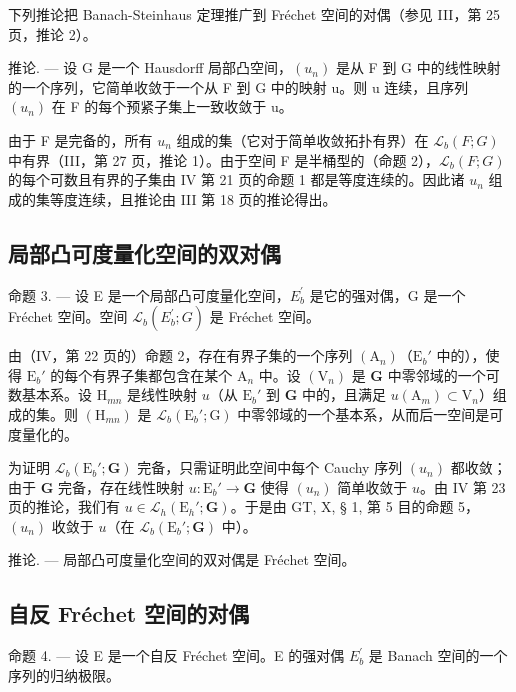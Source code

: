 下列推论把 Banach-Steinhaus 定理推广到 Fréchet 空间的对偶（参见 III，第 25 页，推论 2）。

推论. --- 设 G 是一个 Hausdorff 局部凸空间，\((u_{n})\) 是从 F 到 G 中的线性映射的一个序列，它简单收敛于一个从 F 到 G 中的映射 u。则 u 连续，且序列 \((u_{n})\) 在 F 的每个预紧子集上一致收敛于 u。

由于 F 是完备的，所有 \(u_{n}\) 组成的集（它对于简单收敛拓扑有界）在 \(\mathcal{L}_{b}(F;G)\) 中有界（III，第 27 页，推论 1）。由于空间 F 是半桶型的（命题 2），\(\mathcal{L}_{b}(F;G)\) 的每个可数且有界的子集由 IV 第 21 页的命题 1 都是等度连续的。因此诸 \(u_{n}\) 组成的集等度连续，且推论由 III 第 18 页的推论得出。

\subsection{局部凸可度量化空间的双对偶}

命题 3. --- 设 E 是一个局部凸可度量化空间，\(E_{b}^{\prime}\) 是它的强对偶，G 是一个 Fréchet 空间。空间 \(\mathcal{L}_{b}(E_{b}^{\prime}; G)\) 是 Fréchet 空间。

由（IV，第 22 页的）命题 2，存在有界子集的一个序列 \((\mathrm{A}_n)\)（\(\mathrm{E}_b'\) 中的），使得 \(\mathrm{E}_b'\) 的每个有界子集都包含在某个 \(\mathrm{A}_n\) 中。设 \((\mathrm{V}_n)\) 是 \(\mathbf{G}\) 中零邻域的一个可数基本系。设 \(\mathrm{H}_{mn}\) 是线性映射 \(u\)（从 \(\mathrm{E}_b'\) 到 \(\mathbf{G}\) 中的，且满足 \(u(\mathrm{A}_m) \subset \mathrm{V}_n\)）组成的集。则 \((\mathrm{H}_{mn})\) 是 \(\mathcal{L}_b(\mathrm{E}_b'; \mathrm{G})\) 中零邻域的一个基本系，从而后一空间是可度量化的。

为证明 \(\mathcal{L}_b(\mathrm{E}_b';\mathbf{G})\) 完备，只需证明此空间中每个 Cauchy 序列 \((u_n)\) 都收敛；由于 \(\mathbf{G}\) 完备，存在线性映射 \(u:\mathrm{E}_b' \to \mathbf{G}\) 使得 \((u_n)\) 简单收敛于 \(u\)。由 IV 第 23 页的推论，我们有 \(u \in \mathcal{L}_h(\mathrm{E}_h';\mathbf{G})\)。于是由 GT, X, § 1, 第 5 目的命题 5，\((u_n)\) 收敛于 \(u\)（在 \(\mathcal{L}_b(\mathrm{E}_b';\mathbf{G})\) 中）。

推论. --- 局部凸可度量化空间的双对偶是 Fréchet 空间。

\subsection{自反 Fréchet 空间的对偶}

命题 4. --- 设 E 是一个自反 Fréchet 空间。E 的强对偶 \(E_{b}^{\prime}\) 是 Banach 空间的一个序列的归纳极限。

